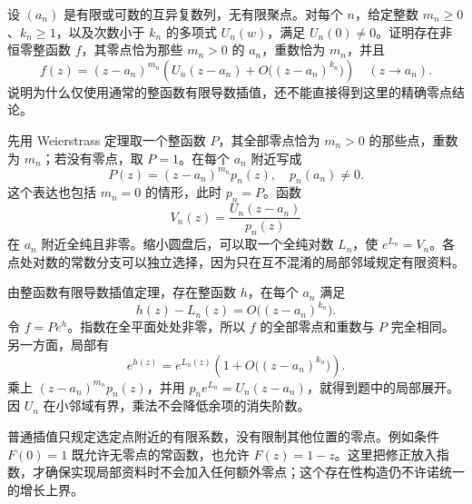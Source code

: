 \begin{exercise}[保留全部零点的有限导数插值]\label{b3:ex:20-draft-03}
设 \((a_n)\) 是有限或可数的互异复数列，无有限聚点。对每个 \(n\)，给定整数 \(m_n\ge0\)、\(k_n\ge1\)，以及次数小于 \(k_n\) 的多项式 \(U_n(w)\)，满足 \(U_n(0)\ne0\)。证明存在非恒零整函数 \(f\)，其零点恰为那些 \(m_n>0\) 的 \(a_n\)，重数恰为 \(m_n\)，并且
\[
 f(z)=(z-a_n)^{m_n}
 \left(U_n(z-a_n)+O\bigl((z-a_n)^{k_n}\bigr)\right)
 \quad(z\to a_n).
\]
说明为什么仅使用通常的整函数有限导数插值，还不能直接得到这里的精确零点结论。
\end{exercise}
\begin{solution}
先用 Weierstrass 定理取一个整函数 \(P\)，其全部零点恰为 \(m_n>0\) 的那些点，重数为 \(m_n\)；若没有零点，取 \(P=1\)。在每个 \(a_n\) 附近写成
\[
 P(z)=(z-a_n)^{m_n}p_n(z),\quad p_n(a_n)\ne0.
\]
这个表达也包括 \(m_n=0\) 的情形，此时 \(p_n=P\)。函数
\[
 V_n(z)=\frac{U_n(z-a_n)}{p_n(z)}
\]
在 \(a_n\) 附近全纯且非零。缩小圆盘后，可以取一个全纯对数 \(L_n\)，使 \(e^{L_n}=V_n\)。各点处对数的常数分支可以独立选择，因为只在互不混淆的局部邻域规定有限资料。

由整函数有限导数插值定理，存在整函数 \(h\)，在每个 \(a_n\) 满足
\[
 h(z)-L_n(z)=O\bigl((z-a_n)^{k_n}\bigr).
\]
令 \(f=P e^h\)。指数在全平面处处非零，所以 \(f\) 的全部零点和重数与 \(P\) 完全相同。另一方面，局部有
\[
 e^{h(z)}=e^{L_n(z)}
 \left(1+O\bigl((z-a_n)^{k_n}\bigr)\right).
\]
乘上 \((z-a_n)^{m_n}p_n(z)\)，并用 \(p_n e^{L_n}=U_n(z-a_n)\)，就得到题中的局部展开。因 \(U_n\) 在小邻域有界，乘法不会降低余项的消失阶数。

普通插值只规定选定点附近的有限系数，没有限制其他位置的零点。例如条件 \(F(0)=1\) 既允许无零点的常函数，也允许 \(F(z)=1-z\)。这里把修正放入指数，才确保实现局部资料时不会加入任何额外零点；这个存在性构造仍不许诺统一的增长上界。
\end{solution}

